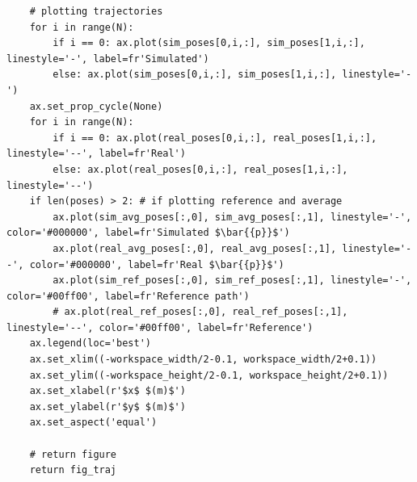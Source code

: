 \documentclass[11pt]{article}
\begin{document}
\begin{verbatim}
    # plotting trajectories
    for i in range(N):
        if i == 0: ax.plot(sim_poses[0,i,:], sim_poses[1,i,:], linestyle='-', label=fr'Simulated')
        else: ax.plot(sim_poses[0,i,:], sim_poses[1,i,:], linestyle='-')
    ax.set_prop_cycle(None)
    for i in range(N):
        if i == 0: ax.plot(real_poses[0,i,:], real_poses[1,i,:], linestyle='--', label=fr'Real')
        else: ax.plot(real_poses[0,i,:], real_poses[1,i,:], linestyle='--')
    if len(poses) > 2: # if plotting reference and average
        ax.plot(sim_avg_poses[:,0], sim_avg_poses[:,1], linestyle='-', color='#000000', label=fr'Simulated $\bar{{p}}$')
        ax.plot(real_avg_poses[:,0], real_avg_poses[:,1], linestyle='--', color='#000000', label=fr'Real $\bar{{p}}$')
        ax.plot(sim_ref_poses[:,0], sim_ref_poses[:,1], linestyle='-', color='#00ff00', label=fr'Reference path')
        # ax.plot(real_ref_poses[:,0], real_ref_poses[:,1], linestyle='--', color='#00ff00', label=fr'Reference')
    ax.legend(loc='best')
    ax.set_xlim((-workspace_width/2-0.1, workspace_width/2+0.1))
    ax.set_ylim((-workspace_height/2-0.1, workspace_height/2+0.1))
    ax.set_xlabel(r'$x$ $(m)$')
    ax.set_ylabel(r'$y$ $(m)$')
    ax.set_aspect('equal')

    # return figure
    return fig_traj
\end{verbatim}
\end{document}
